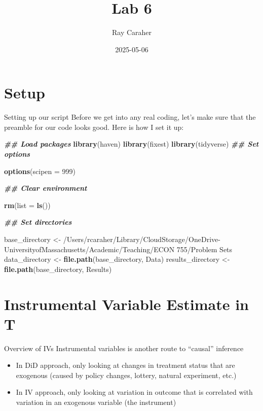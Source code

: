 \documentclass[
  ignorenonframetext,
]{beamer}
\title{Lab 6}
\author{Ray Caraher}
\date{2025-05-06}
\newenvironment{Shaded}{\begin{snugshade}}{\end{snugshade}}
\newcommand{\AttributeTok}[1]{\textcolor[rgb]{0.13,0.29,0.53}{#1}}
\newcommand{\DecValTok}[1]{\textcolor[rgb]{0.00,0.00,0.81}{#1}}
\newcommand{\DocumentationTok}[1]{\textcolor[rgb]{0.56,0.35,0.01}{\textbf{\textit{#1}}}}
\newcommand{\FunctionTok}[1]{\textcolor[rgb]{0.13,0.29,0.53}{\textbf{#1}}}
\newcommand{\NormalTok}[1]{#1}
\newcommand{\OtherTok}[1]{\textcolor[rgb]{0.56,0.35,0.01}{#1}}
\newcommand{\StringTok}[1]{\textcolor[rgb]{0.31,0.60,0.02}{#1}}
\providecommand{\tightlist}{%
  \setlength{\itemsep}{0pt}\setlength{\parskip}{0pt}}
\begin{document}
\frame{\titlepage}

\section{Setup}\label{setup}

\begin{frame}[fragile]{Setting up our script}
\label{setting-up-our-script}
Before we get into any real coding, let's make sure that the preamble
for our code looks good. Here is how I set it up:

\tiny

\begin{Shaded}
\begin{Highlighting}[]
\DocumentationTok{\#\# Load packages}
\FunctionTok{library}\NormalTok{(haven)}
\FunctionTok{library}\NormalTok{(fixest)}
\FunctionTok{library}\NormalTok{(tidyverse)}
\DocumentationTok{\#\# Set options}

\FunctionTok{options}\NormalTok{(}\AttributeTok{scipen =} \DecValTok{999}\NormalTok{)}

\DocumentationTok{\#\# Clear environment}

\FunctionTok{rm}\NormalTok{(}\AttributeTok{list =} \FunctionTok{ls}\NormalTok{())}

\DocumentationTok{\#\# Set directories}

\NormalTok{base\_directory }\OtherTok{\textless{}{-}} \StringTok{\textquotesingle{}/Users/rcaraher/Library/CloudStorage/OneDrive{-}UniversityofMassachusetts/Academic/Teaching/ECON 755/Problem Sets\textquotesingle{}}
\NormalTok{data\_directory }\OtherTok{\textless{}{-}} \FunctionTok{file.path}\NormalTok{(base\_directory, }\StringTok{\textquotesingle{}Data\textquotesingle{}}\NormalTok{)}
\NormalTok{results\_directory }\OtherTok{\textless{}{-}} \FunctionTok{file.path}\NormalTok{(base\_directory, }\StringTok{\textquotesingle{}Results\textquotesingle{}}\NormalTok{)}
\end{Highlighting}
\end{Shaded}
\end{frame}

\section{Instrumental Variable Estimate in
T}\label{instrumental-variable-estimate-in-t}

\begin{frame}{Overview of IVs}
\label{overview-of-ivs}
Instrumental variables is another route to ``causal'' inference

\begin{itemize}
\tightlist
\item
  In DiD approach, only looking at changes in treatment status that are
  exogenous (caused by policy changes, lottery, natural experiment,
  etc.)
\item
  In IV approach, only looking at variation in outcome that is
  correlated with variation in an exogenous variable (the instrument)
\end{itemize}
\end{frame}
\end{document}
